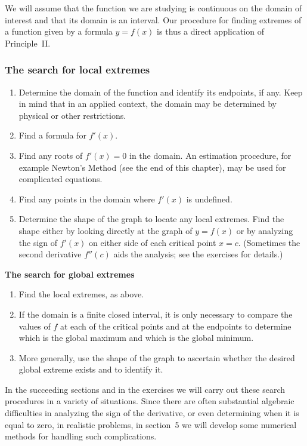 	We will assume that the function we are studying is continuous on the domain of interest and that its domain is an interval.   Our procedure for finding extremes of a function given by a formula $y=f(x)$ is thus a direct application of \mbox{Principle II.}   

\subsubsection{The search for local extremes}
\label{subsubsec:the-search-for-local-extremes}

\begin{enumerate}
\item Determine the domain of the function and identify its endpoints, if any.  Keep in mind that in an applied context, the domain may be determined by physical or other restrictions.  
\item  Find a formula for $f'(x)$.
\item  Find any roots of $f'(x) = 0$ in the domain.  An estimation procedure, for example Newton's Method (see the end of this chapter),  may be used for complicated equations.
\item  Find any points in the domain where $f'(x)$ is undefined.
\item  Determine the shape of the graph to locate any local extremes.  Find the shape either by looking directly at the graph of $y = f(x)$ or by analyzing the sign of $f'(x)$ on either side of each critical point $x=c$.  (Sometimes the second derivative $f''(c)$ aids the analysis; see the exercises for details.)
\end{enumerate}





{\bf The search for global extremes}
\begin{enumerate}
\item  Find the local extremes, as above.
\item  If the domain is a finite closed interval, it is only necessary to compare the values of $f$ at each of the critical points and at the endpoints to determine which is the global maximum and which is the global minimum.
\item  More generally, use the shape of the graph to ascertain whether the desired global extreme exists and to identify it.
\end{enumerate}

In the succeeding sections and in the exercises we will carry out
these search procedures in a variety of situations. Since there are
often substantial algebraic difficulties in analyzing the sign of the
derivative, or even determining when it is equal to zero, in realistic
problems, in section~5 we will develop some numerical methods for
handling such complications.
\label{crit-end}


